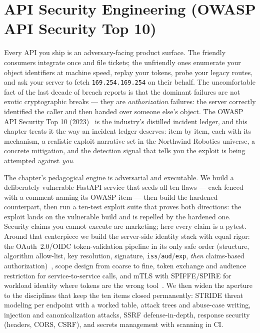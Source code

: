 \chapter{API Security Engineering (OWASP API Security Top 10)}
\label{ch:api_security}

Every API you ship is an adversary-facing product surface. The friendly
consumers integrate once and file tickets; the unfriendly ones enumerate
your object identifiers at machine speed, replay your tokens, probe your
legacy routes, and ask your server to fetch \texttt{169.254.169.254} on
their behalf. The uncomfortable fact of the last decade of breach reports is
that the dominant failures are not exotic cryptographic breaks --- they are
\emph{authorization} failures: the server correctly identified the caller
and then handed over someone else's object. The OWASP API Security Top 10
(2023)~\cite{owaspapisecurity} is the industry's distilled incident ledger,
and this chapter treats it the way an incident ledger deserves: item by
item, each with its mechanism, a realistic exploit narrative set in the
Northwind Robotics universe, a concrete mitigation, and the detection signal
that tells you the exploit is being attempted against \emph{you}.

The chapter's pedagogical engine is adversarial and executable. We build a
deliberately vulnerable FastAPI service that seeds all ten flaws --- each
fenced with a comment naming its OWASP item --- then build the hardened
counterpart, then run a ten-test exploit suite that proves both directions:
the exploit lands on the vulnerable build and is repelled by the hardened
one. Security claims you cannot execute are marketing; here every claim is a
pytest. Around that centerpiece we build the server-side identity stack with
equal rigor: the OAuth~2.0/OIDC token-validation pipeline in its only safe
order (structure, algorithm allow-list, key resolution, signature,
\texttt{iss}/\texttt{aud}/\texttt{exp}, \emph{then} claims-based
authorization)~\cite{rfc7519,rfc6749}, scope design from coarse to fine,
token exchange and audience restriction for service-to-service calls, and
mTLS with SPIFFE/SPIRE for workload identity where tokens are the wrong
tool~\cite{rfc8446}. We then widen the aperture to the disciplines that keep
the ten items closed permanently: STRIDE threat modeling per endpoint with a
worked table, attack trees and abuse-case writing, injection and
canonicalization attacks, SSRF defense-in-depth, response security (headers,
CORS, CSRF), and secrets management with scanning in CI.

